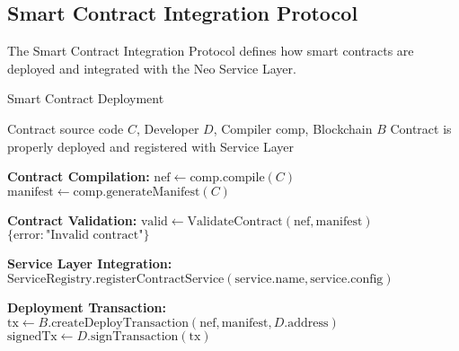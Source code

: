\subsection{Smart Contract Integration Protocol}
\label{subsec:smart-contract-protocol}

The Smart Contract Integration Protocol defines how smart contracts are deployed and integrated with the Neo Service Layer.

\begin{tcolorbox}[
    enhanced,
    colback=blue!5!white,
    colframe=blue!75!black,
    arc=5mm,
    boxrule=1.5pt,
    title=Smart Contract Protocol,
    fonttitle=\bfseries,
    coltitle=white,
    attach boxed title to top left={yshift=-2mm, xshift=5mm},
    boxed title style={colback=blue!75!black, rounded corners},
    shadow={2mm}{-2mm}{0mm}{black!50},
    drop fuzzy shadow
]
\begin{tcolorbox}[
    enhanced,
    colback=blue!5!white,
    colframe=blue!75!black,
    arc=5mm,
    boxrule=1.5pt,
    title=Protocol,
    fonttitle=\bfseries,
    coltitle=white,
    attach boxed title to top left={yshift=-2mm, xshift=5mm},
    boxed title style={colback=blue!75!black, rounded corners},
    shadow={2mm}{-2mm}{0mm}{black!50},
    drop fuzzy shadow
]
\begin{protocol}{Smart Contract Deployment}
\label{prot:smart-contract-deployment}
\begin{algorithmic}[1]
\Require Contract source code $C$, Developer $D$, Compiler $\text{comp}$, Blockchain $B$
\Ensure Contract is properly deployed and registered with Service Layer

\State \textbf{Contract Compilation:}
\State $\text{nef} \gets \text{comp}.\text{compile}(C)$
\State $\text{manifest} \gets \text{comp}.\text{generateManifest}(C)$

\State \textbf{Contract Validation:}
\State $\text{valid} \gets \text{ValidateContract}(\text{nef}, \text{manifest})$
    \State \Return $\{\text{error}: \text{"Invalid contract"}\}$
\EndIf

\State \textbf{Service Layer Integration:}
    \State $\text{ServiceRegistry}.\text{registerContractService}(\text{service}.\text{name}, \text{service}.\text{config})$
\EndFor

\State \textbf{Deployment Transaction:}
\State $\text{tx} \gets B.\text{createDeployTransaction}(\text{nef}, \text{manifest}, D.\text{address})$
\State $\text{signedTx} \gets D.\text{signTransaction}(\text{tx})$


\end{algorithmic}
\end{protocol}
\end{tcolorbox}
\end{tcolorbox}
